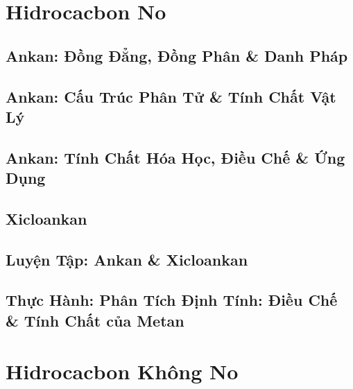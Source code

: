 \documentclass[oneside]{book}
\numberwithin{equation}{section}
\begin{document}

\chapter{Hidrocacbon No}

\section{Ankan: Đồng Đẳng, Đồng Phân \& Danh Pháp}


\section{Ankan: Cấu Trúc Phân Tử \& Tính Chất Vật Lý}


\section{Ankan: Tính Chất Hóa Học, Điều Chế \& Ứng Dụng}


\section{Xicloankan}


\section{Luyện Tập: Ankan \& Xicloankan}


\section{Thực Hành: Phân Tích Định Tính: Điều Chế \& Tính Chất của Metan}


\chapter{Hidrocacbon Không No}
\end{document}
